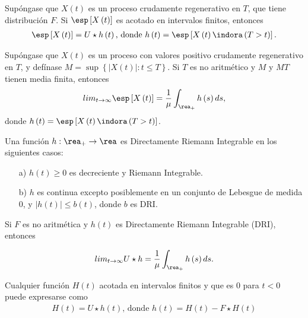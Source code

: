 \begin{Prop}
Sup\'ongase que $X\left(t\right)$ es un proceso crudamente regenerativo en $T$, que tiene distribuci\'on $F$. Si $\esp\left[X\left(t\right)\right]$ es acotado en intervalos finitos, entonces
\begin{eqnarray*}
\esp\left[X\left(t\right)\right]=U\star h\left(t\right)\textrm{,  donde }h\left(t\right)=\esp\left[X\left(t\right)\indora\left(T>t\right)\right].
\end{eqnarray*}
\end{Prop}

\begin{Teo}
Sup\'ongase que $X\left(t\right)$ es un proceso con valores positivo crudamente regenerativo en $T$, y def\'inase $M=\sup\left\{|X\left(t\right)|:t\leq T\right\}$. Si $T$ es no aritm\'etico y $M$ y $MT$ tienen media finita, entonces
\begin{eqnarray*}
lim_{t\rightarrow\infty}\esp\left[X\left(t\right)\right]=\frac{1}{\mu}\int_{\rea_{+}}h\left(s\right)ds,
\end{eqnarray*}
donde $h\left(t\right)=\esp\left[X\left(t\right)\indora\left(T>t\right)\right]$.
\end{Teo}


\begin{Note} Una funci\'on $h:\rea_{+}\rightarrow\rea$ es Directamente Riemann Integrable en los siguientes casos:
\begin{itemize}
\item[a)] $h\left(t\right)\geq0$ es decreciente y Riemann Integrable.
\item[b)] $h$ es continua excepto posiblemente en un conjunto de Lebesgue de medida 0, y $|h\left(t\right)|\leq b\left(t\right)$, donde $b$ es DRI.
\end{itemize}
\end{Note}

\begin{Teo}
Si $F$ es no aritm\'etica y $h\left(t\right)$ es Directamente Riemann Integrable (DRI), entonces

\begin{eqnarray*}
lim_{t\rightarrow\infty}U\star h=\frac{1}{\mu}\int_{\rea_{+}}h\left(s\right)ds.
\end{eqnarray*}
\end{Teo}

\begin{Prop}
Cualquier funci\'on $H\left(t\right)$ acotada en intervalos finitos y que es 0 para $t<0$ puede expresarse como
\begin{eqnarray*}
H\left(t\right)=U\star h\left(t\right)\textrm{,  donde }h\left(t\right)=H\left(t\right)-F\star H\left(t\right)
\end{eqnarray*}
\end{Prop}

